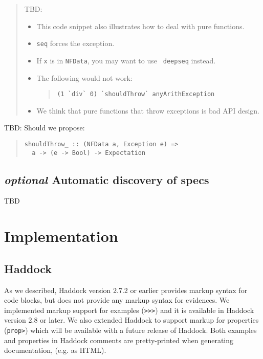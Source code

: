 \documentclass[preprint]{sigplanconf}
\begin{document}
\begin{quote}
    TBD:
    \begin{itemize}
        \item
            This code snippet also illustrates how to deal with pure
            functions.
        \item
            {\tt seq} forces the exception.
        \item
            If {\tt x} is in {\tt NFData}, you may want to use {\tt
            deepseq} instead.
        \item
            The following would not work:
\begin{quote}\small\begin{verbatim}
(1 `div` 0) `shouldThrow` anyArithException
\end{verbatim}\end{quote}
        \item
            We think that pure functions that throw exceptions is bad
            API design.
    \end{itemize}
\end{quote}

TBD: Should we propose:
\begin{quote}\small\begin{verbatim}
shouldThrow_ :: (NFData a, Exception e) =>
  a -> (e -> Bool) -> Expectation
\end{verbatim}\end{quote}

\subsection{\emph{optional} Automatic discovery of specs}
TBD


\section{Implementation}

\subsection{Haddock}

As we described, Haddock version 2.7.2 or earlier provides markup syntax for
code blocks, but does not provide any markup syntax for evidences.
We implemented markup support for examples ({\tt >>>}) and it is available in
Haddock version 2.8 or later.
We also extended Haddock to support markup for properties ({\tt prop>}) which
will be available with a future release of Haddock.
Both examples and properties in Haddock comments are pretty-printed when
generating documentation, (e.g. as HTML).
\end{document}
